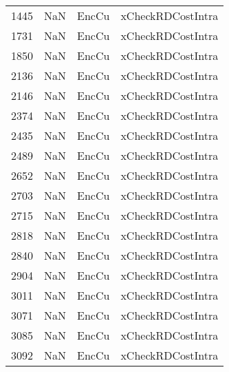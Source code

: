 \begin{tabular}{llll}
1445 &                   NaN &                      EncCu &                         xCheckRDCostIntra \\
1731 &                   NaN &                      EncCu &                         xCheckRDCostIntra \\
1850 &                   NaN &                      EncCu &                         xCheckRDCostIntra \\
2136 &                   NaN &                      EncCu &                         xCheckRDCostIntra \\
2146 &                   NaN &                      EncCu &                         xCheckRDCostIntra \\
2374 &                   NaN &                      EncCu &                         xCheckRDCostIntra \\
2435 &                   NaN &                      EncCu &                         xCheckRDCostIntra \\
2489 &                   NaN &                      EncCu &                         xCheckRDCostIntra \\
2652 &                   NaN &                      EncCu &                         xCheckRDCostIntra \\
2703 &                   NaN &                      EncCu &                         xCheckRDCostIntra \\
2715 &                   NaN &                      EncCu &                         xCheckRDCostIntra \\
2818 &                   NaN &                      EncCu &                         xCheckRDCostIntra \\
2840 &                   NaN &                      EncCu &                         xCheckRDCostIntra \\
2904 &                   NaN &                      EncCu &                         xCheckRDCostIntra \\
3011 &                   NaN &                      EncCu &                         xCheckRDCostIntra \\
3071 &                   NaN &                      EncCu &                         xCheckRDCostIntra \\
3085 &                   NaN &                      EncCu &                         xCheckRDCostIntra \\
3092 &                   NaN &                      EncCu &                         xCheckRDCostIntra \\

\end{tabular}
